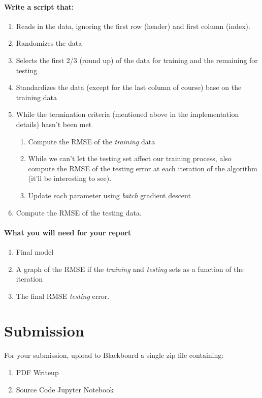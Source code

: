 \documentclass[12pt]{article}
\begin{document}
\paragraph{Write a script that:}
\begin{enumerate}
  \item Reads in the data, ignoring the first row (header) and first column (index).
  \item Randomizes the data
  \item Selects the first 2/3 (round up) of the data for training and the remaining for testing
  \item Standardizes the data (except for the last column of course) base on the training data
  \item While the termination criteria (mentioned above in the implementation details) hasn't been met
  \begin{enumerate}
  	\item Compute the RMSE of the \emph{training} data
  	\item While we can't let the testing set affect our training process, also compute the RMSE of the testing error at each iteration of the algorithm (it'll be interesting to see).
  	\item Update each parameter using \emph{batch} gradient descent
  \end{enumerate}
  \item Compute the RMSE of the testing data.
\end{enumerate}



\paragraph{What you will need for your report}
\begin{enumerate}
\item Final model
\item A graph of the RMSE if the \emph{training} and \emph{testing} sets as a function of the iteration
\item The final RMSE \emph{testing} error.
\end{enumerate}


\newpage
\section*{Submission}
For your submission, upload to Blackboard a single zip file containing:

\begin{enumerate}
\item PDF Writeup
\item Source Code Jupyter Notebook
\end{enumerate}
\end{document}
